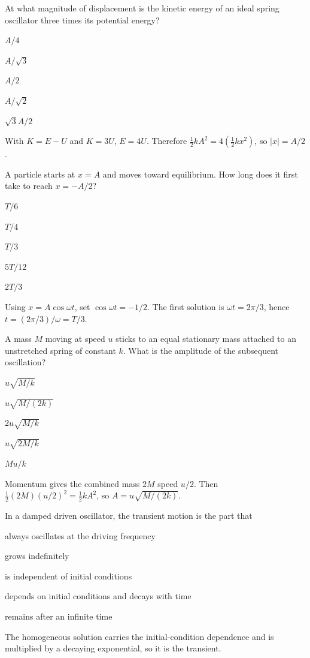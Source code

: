 \documentclass[10pt,a4paper,full]{physicsquiz}
\newcommand{\bankq}[9]{%
  \begin{quizquestion}[
    id=#1,
    topic={#2},
    difficulty=#3,
    marks=1,
    correct=#4,
    tags={#5},
    outcome={#6}
  ]
    #7
    \begin{choiceoptions}
      #8
    \end{choiceoptions}
  \end{quizquestion}
  \begin{quizsolution}
    #9
  \end{quizsolution}
}
\begin{document}
\begin{quizbank}
\bankq{shm-010}{SHM and Energy}{challenge}{C}{shm,energy,multistep}{Relate kinetic and potential energy to displacement.}{%
At what magnitude of displacement is the kinetic energy of an ideal spring oscillator three times its potential energy?}{%
\item \(A/4\)
\item \(A/\sqrt{3}\)
\item \(A/2\)
\item \(A/\sqrt{2}\)
\item \(\sqrt{3}A/2\)}{%
With \(K=E-U\) and \(K=3U\), \(E=4U\). Therefore \(\tfrac12kA^2=4(\tfrac12kx^2)\), so \(|x|=A/2\).}

\bankq{shm-011}{SHM and Energy}{challenge}{C}{shm,phase,time}{Determine a travel time between two SHM positions.}{%
A particle starts at \(x=A\) and moves toward equilibrium. How long does it first take to reach \(x=-A/2\)?}{%
\item \(T/6\)
\item \(T/4\)
\item \(T/3\)
\item \(5T/12\)
\item \(2T/3\)}{%
Using \(x=A\cos\omega t\), set \(\cos\omega t=-1/2\). The first solution is \(\omega t=2\pi/3\), hence \(t=(2\pi/3)/\omega=T/3\).}

\bankq{shm-012}{SHM and Energy}{challenge}{B}{shm,collision,energy}{Combine momentum conservation with SHM energy.}{%
A mass \(M\) moving at speed \(u\) sticks to an equal stationary mass attached to an unstretched spring of constant \(k\). What is the amplitude of the subsequent oscillation?}{%
\item \(u\sqrt{M/k}\)
\item \(u\sqrt{M/(2k)}\)
\item \(2u\sqrt{M/k}\)
\item \(u\sqrt{2M/k}\)
\item \(Mu/k\)}{%
Momentum gives the combined mass \(2M\) speed \(u/2\). Then \(\tfrac12(2M)(u/2)^2=\tfrac12kA^2\), so \(A=u\sqrt{M/(2k)}\).}


\bankq{damping-013}{Damping, Resonance, and Transients}{foundation}{D}{damping,transient}{Distinguish transient and steady-state motion.}{%
In a damped driven oscillator, the transient motion is the part that}{%
\item always oscillates at the driving frequency
\item grows indefinitely
\item is independent of initial conditions
\item depends on initial conditions and decays with time
\item remains after an infinite time}{%
The homogeneous solution carries the initial-condition dependence and is multiplied by a decaying exponential, so it is the transient.}


\end{quizbank}
\end{document}
